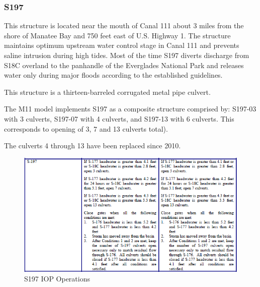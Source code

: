 


\clearpage
\subsubsection{S197}
This structure is located near the mouth of Canal 111 about 3 miles from the shore of Manatee Bay and 750 feet east of U.S. Highway 1. The structure maintains optimum upstream water control stage in Canal 111 and prevents saline intrusion during high tides. Most of the time S197 diverts discharge from S18C overland to the panhandle of the Everglades National Park and releases water only during major floods according to the established guidelines.

This structure is a thirteen-barreled corrugated metal pipe culvert.

The M11 model implements S197 as a composite structure comprised by: S197-03 with 3 culverts, S197-07 with 4 culverts, and S197-13 with 6 culverts. This corresponds to opening of 3, 7 and 13 culverts total).

The culverts 4 through 13 have been replaced since 2010.


\begin{figure}[!h]
  \begin{center}
  \includegraphics[width=6.5in]{../figs/S197_IOPops.png}
  \caption{S197 IOP Operations}
  \label{fig:S197iop}
  \end{center}
\end{figure}



